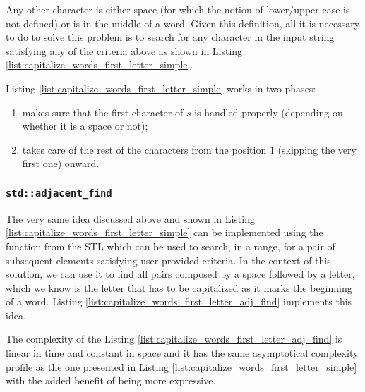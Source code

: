 Any other character is either space (for which the notion of lower/upper case is not defined) or is in the middle of a word. 
Given this definition, all it is necessary to do to solve this problem is to search for any character in the input string satisfying any of the criteria above as shown in Listing \ref{list:capitalize_words_first_letter_simple}.



Listing \ref{list:capitalize_words_first_letter_simple} works in two phases:
\begin{enumerate}
	\item makes sure that the first character of $s$ is handled properly (depending on whether it is a space or not);
	\item takes care of the rest of the characters from the position $1$ (skipping the very first one) onward.
\end{enumerate}

\subsubsection{\texttt{std::adjacent\_find}}
The very same idea discussed above and shown in Listing \ref{list:capitalize_words_first_letter_simple} can be implemented using the function \cite{cit::std::adjancefind} from the STL which can be used to search, in a range, for a pair of subsequent elements satisfying user-provided criteria. In the context of this solution, we can use it to find all pairs composed by a space followed by a letter, which we know is the letter that has to be capitalized as it marks the beginning of a word.
Listing \ref{list:capitalize_words_first_letter_adj_find} implements this idea. 



The complexity of the Listing \ref{list:capitalize_words_first_letter_adj_find}  is linear in time and constant in space and it has the same asymptotical complexity profile as the one presented in Listing \ref{list:capitalize_words_first_letter_simple} with the added benefit of being more expressive.

